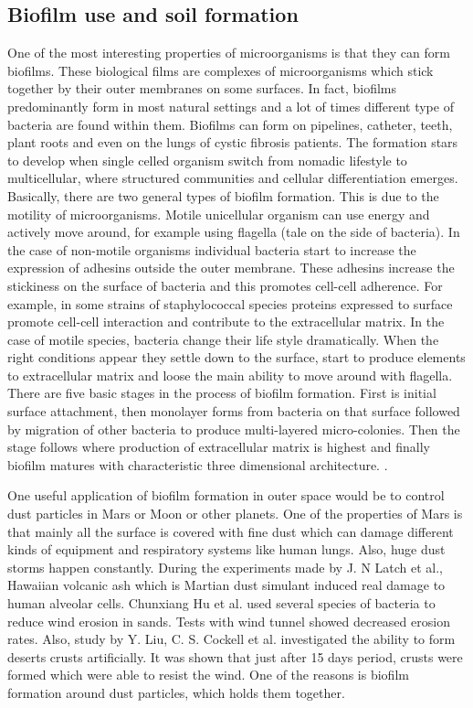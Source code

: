 \documentclass[12pt]{article}
\begin{document}
\subsection{Biofilm use and soil formation}
One of the most interesting properties of microorganisms is that they can form biofilms. These
biological films are complexes of microorganisms which stick together by their outer
membranes on some surfaces. In fact, biofilms predominantly form in most natural settings and
a lot of times different type of bacteria are found within them. Biofilms can form on pipelines,
catheter, teeth, plant roots and even on the lungs of cystic fibrosis patients. The formation stars
to develop when single celled organism switch from nomadic lifestyle to multicellular, where
structured communities and cellular differentiation emerges. Basically, there are two general
types of biofilm formation. This is due to the motility of microorganisms. Motile unicellular
organism can use energy and actively move around, for example using flagella (tale on the side
of bacteria). In the case of non-motile organisms individual bacteria start to increase the
expression of adhesins outside the outer membrane. These adhesins increase the stickiness on
the surface of bacteria and this promotes cell-cell adherence. For example, in some strains of
staphylococcal species proteins expressed to surface promote cell-cell interaction and contribute
to the extracellular matrix. In the case of motile species, bacteria change their life style
dramatically. When the right conditions appear they settle down to the surface, start to produce
elements to extracellular matrix and loose the main ability to move around with flagella. There
are five basic stages in the process of biofilm formation. First is initial surface attachment, then
monolayer forms from bacteria on that surface followed by migration of other bacteria to
produce multi-layered micro-colonies. Then the stage follows where production of extracellular
matrix is highest and finally biofilm matures with characteristic three dimensional architecture.
.

One useful application of biofilm formation in outer space would be to control dust particles in
Mars or Moon or other planets. One of the properties of Mars is that mainly all the surface is
covered with fine dust which can damage different kinds of equipment and respiratory systems
like human lungs. Also, huge dust storms happen constantly. During the experiments made by J.
N Latch et al., Hawaiian volcanic ash which is Martian dust simulant induced real damage to
human alveolar cells. Chunxiang Hu et al. used several species of bacteria to reduce wind
erosion in sands. Tests with wind tunnel showed decreased erosion rates. Also, study by Y.
Liu, C. S. Cockell et al. investigated the ability to form deserts crusts artificially. It was shown
that just after 15 days period, crusts were formed which were able to resist the wind. One of the
reasons is biofilm formation around dust particles, which holds them together.
\end{document}
